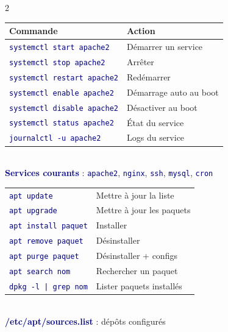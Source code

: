 \documentclass[a4paper,10pt]{article}
\newcommand{\key}[1]{\textbf{\textcolor{navy}{#1}}}
\newcommand{\cmd}[1]{\texttt{\textcolor{navy}{#1}}}
\begin{document}
\begin{multicols}{2}
\begin{tcolorbox}[basebox, colframe=navy, title=5. Gestion des services (systemd)]
\begin{tabular}{ll}
\toprule
\textbf{Commande} & \textbf{Action} \\
\midrule
\cmd{systemctl start apache2} & Démarrer un service \\
\cmd{systemctl stop apache2} & Arrêter \\
\cmd{systemctl restart apache2} & Redémarrer \\
\cmd{systemctl enable apache2} & Démarrage auto au boot \\
\cmd{systemctl disable apache2} & Désactiver au boot \\
\cmd{systemctl status apache2} & État du service \\
\cmd{journalctl -u apache2} & Logs du service \\
\bottomrule
\end{tabular}
\vspace{4pt}\\
\key{Services courants} : \cmd{apache2}, \cmd{nginx}, \cmd{ssh}, \cmd{mysql}, \cmd{cron}
\end{tcolorbox}

\begin{tcolorbox}[basebox, colframe=green, title=6. Gestion des paquets (Debian/Ubuntu)]
\begin{tabular}{ll}
\toprule
\cmd{apt update} & Mettre à jour la liste \\
\cmd{apt upgrade} & Mettre à jour les paquets \\
\cmd{apt install paquet} & Installer \\
\cmd{apt remove paquet} & Désinstaller \\
\cmd{apt purge paquet} & Désinstaller + configs \\
\cmd{apt search nom} & Rechercher un paquet \\
\cmd{dpkg -l | grep nom} & Lister paquets installés \\
\bottomrule
\end{tabular}
\vspace{4pt}\\
\key{/etc/apt/sources.list} : dépôts configurés
\end{tcolorbox}


\end{multicols}
\end{document}
